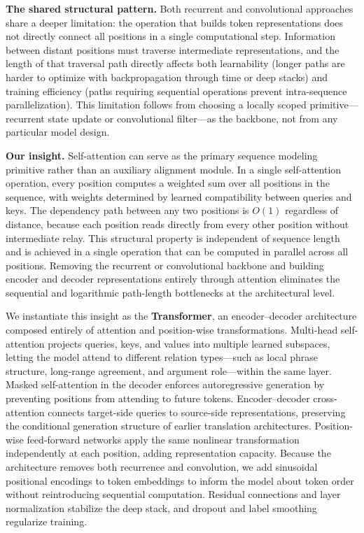 ﻿\documentclass{article}
\begin{document}
\textbf{The shared structural pattern.} Both recurrent and convolutional approaches share a deeper limitation: the operation that builds token representations does not directly connect all positions in a single computational step. Information between distant positions must traverse intermediate representations, and the length of that traversal path directly affects both learnability (longer paths are harder to optimize with backpropagation through time or deep stacks) and training efficiency (paths requiring sequential operations prevent intra-sequence parallelization). This limitation follows from choosing a locally scoped primitive---recurrent state update or convolutional filter---as the backbone, not from any particular model design.

\textbf{Our insight.} Self-attention can serve as the primary sequence modeling primitive rather than an auxiliary alignment module. In a single self-attention operation, every position computes a weighted sum over all positions in the sequence, with weights determined by learned compatibility between queries and keys. The dependency path between any two positions is $O(1)$ regardless of distance, because each position reads directly from every other position without intermediate relay. This structural property is independent of sequence length and is achieved in a single operation that can be computed in parallel across all positions. Removing the recurrent or convolutional backbone and building encoder and decoder representations entirely through attention eliminates the sequential and logarithmic path-length bottlenecks at the architectural level.

We instantiate this insight as the \textbf{Transformer}, an encoder--decoder architecture composed entirely of attention and position-wise transformations. Multi-head self-attention projects queries, keys, and values into multiple learned subspaces, letting the model attend to different relation types---such as local phrase structure, long-range agreement, and argument role---within the same layer. Masked self-attention in the decoder enforces autoregressive generation by preventing positions from attending to future tokens. Encoder--decoder cross-attention connects target-side queries to source-side representations, preserving the conditional generation structure of earlier translation architectures. Position-wise feed-forward networks apply the same nonlinear transformation independently at each position, adding representation capacity. Because the architecture removes both recurrence and convolution, we add sinusoidal positional encodings to token embeddings to inform the model about token order without reintroducing sequential computation. Residual connections \citep{he2016deep} and layer normalization \citep{ba2016layer} stabilize the deep stack, and dropout and label smoothing regularize training.
\end{document}
